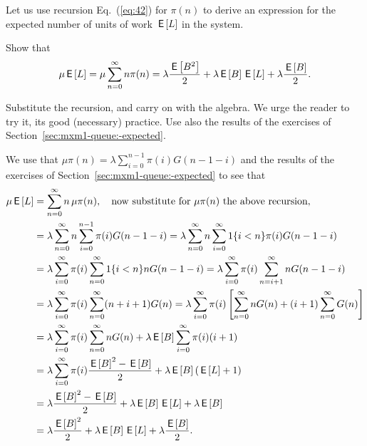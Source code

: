 Let us use  recursion Eq.~(\ref{eq:42}) for $\pi(n)$ to
 derive an expression for the expected number of units of work $\,\mathsf{E}\left[L\right]$
 in the system.
\begin{exercise}{\faCalculator}
 Show that
\begin{equation}\label{eq:67}
  \mu \,\mathsf{E}\left[L\right] =\mu \sum_{n=0}^\infty n \pi(n) = \lambda \frac{\,\mathsf{E}\left[B^2\right]}2  + \lambda \,\mathsf{E}\left[B\right] \,\mathsf{E}\left[L\right] +\lambda \frac{\,\mathsf{E}\left[B\right]}2.
\end{equation}
\begin{hint}
Substitute the
  recursion, and carry on with the algebra. We urge the reader to try
  it, its good (necessary) practice.  Use also the results of the
  exercises of Section~\ref{sec:mxm1-queue:-expected}.  
\end{hint}
\begin{solution}
  We use that $\mu \pi(n) =\lambda \sum_{i=0}^{n-1} \pi(i) G(n-1-i)$
  and the results of the exercises of
  Section~\ref{sec:mxm1-queue:-expected} to see that
\begin{align*}
  \mu \,\mathsf{E}\left[L\right]
  &=\sum_{n=0}^\infty n\, \mu \pi(n), \quad \text{now substitute for $\mu \pi(n)$ the above recursion}, \\
& =\lambda \sum_{n=0}^\infty n \sum_{i=0}^{n-1} \pi(i) G(n-1-i) 
  =\lambda \sum_{n=0}^\infty n \sum_{i=0}^\infty 1\{i<n\} \pi(i) G(n-1-i) \\
& =\lambda \sum_{i=0}^\infty \pi(i) \sum_{n=0}^\infty 1\{i<n\} n G(n-1-i) 
  =\lambda \sum_{i=0}^\infty \pi(i) \sum_{n=i+1}^\infty n G(n-1-i) \\
& =\lambda \sum_{i=0}^\infty \pi(i) \sum_{n=0}^\infty (n+i+1) G(n) 
  =\lambda \sum_{i=0}^\infty \pi(i) \left[\sum_{n=0}^\infty n G(n) +(i+1) \sum_{n=0}^\infty G(n)\right]  \\
  &=\lambda \sum_{i=0}^\infty \pi(i)\sum_{n=0}^\infty n G(n) +\lambda  \,\mathsf{E}\left[B\right] \sum_{i=0}^\infty \pi(i) (i+1)  \\ 
  &=\lambda \sum_{i=0}^\infty \pi(i) \frac{\,\mathsf{E}\left[B\right]^2 -\,\mathsf{E}\left[B\right]}2  + \lambda \,\mathsf{E}\left[B\right] (\,\mathsf{E}\left[L\right] +1)  \\ 
  &= \lambda \frac{\,\mathsf{E}\left[B\right]^2 -\,\mathsf{E}\left[B\right]}2  + \lambda \,\mathsf{E}\left[B\right] \,\mathsf{E}\left[L\right] +\lambda \,\mathsf{E}\left[B\right] \\
  &= \lambda \frac{\,\mathsf{E}\left[B\right]^2 }2  + \lambda \,\mathsf{E}\left[B\right] \,\mathsf{E}\left[L\right] +\lambda \frac{\,\mathsf{E}\left[B\right]}2.
\end{align*}
\end{solution}
\end{exercise}

